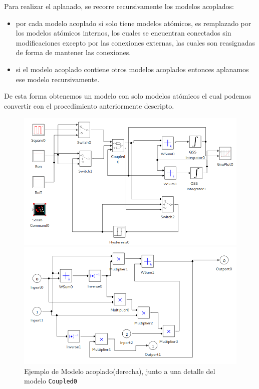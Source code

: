         Para realizar el aplanado, se recorre recursivamente los modelos acoplados:

        \begin{itemize}
                \item por cada modelo acoplado si solo tiene modelos atómicos, es remplazado por los modelos atómicos internos, los cuales se encuentran conectados 
                        sin modificaciones excepto por las conexiones externas, las cuales son reasignadas de forma de mantener las conexiones.
                \item si el modelo acoplado contiene otros modelos acoplados entonces aplanamos ese modelo recursivamente.
        \end{itemize} 

        De esta forma obtenemos un modelo con solo modelos atómicos el cual podemos convertir con el procedimiento anteriormente descripto.

\begin{figure}[H]
        \begin{minipage}{0.5\textwidth}
        \includegraphics[width=\linewidth]{buck_disk}
        \end{minipage}
        \begin{minipage}{0.5\textwidth}
        \includegraphics[width=\linewidth]{buck_disk_coupled0}
        \end{minipage}
 \label{fig:coupledsample}
 \caption{Ejemplo de Modelo acoplado(derecha), junto a una detalle del modelo \texttt{Coupled0}}
\end{figure}

